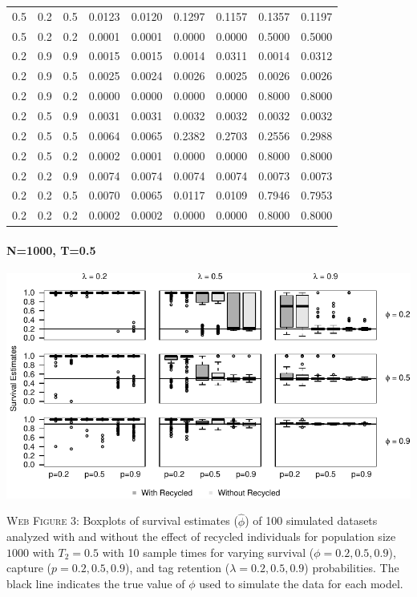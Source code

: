 \documentclass[]{article}
\let\oldparagraph\paragraph
\renewcommand{\paragraph}[1]{\oldparagraph{#1}\mbox{}}
\begin{document}
\begin{table}[ht]
{\begin{tabular}{rrrrrrrrr}
  0.5 & 0.2 & 0.5 & 0.0123 & 0.0120 & 0.1297 & 0.1157 & 0.1357 & 0.1197 \\ 
  0.5 & 0.2 & 0.2 & 0.0001 & 0.0001 & 0.0000 & 0.0000 & 0.5000 & 0.5000 \\ 
  0.2 & 0.9 & 0.9 & 0.0015 & 0.0015 & 0.0014 & 0.0311 & 0.0014 & 0.0312 \\ 
  0.2 & 0.9 & 0.5 & 0.0025 & 0.0024 & 0.0026 & 0.0025 & 0.0026 & 0.0026 \\ 
  0.2 & 0.9 & 0.2 & 0.0000 & 0.0000 & 0.0000 & 0.0000 & 0.8000 & 0.8000 \\ 
  0.2 & 0.5 & 0.9 & 0.0031 & 0.0031 & 0.0032 & 0.0032 & 0.0032 & 0.0032 \\ 
  0.2 & 0.5 & 0.5 & 0.0064 & 0.0065 & 0.2382 & 0.2703 & 0.2556 & 0.2988 \\ 
  0.2 & 0.5 & 0.2 & 0.0002 & 0.0001 & 0.0000 & 0.0000 & 0.8000 & 0.8000 \\ 
  0.2 & 0.2 & 0.9 & 0.0074 & 0.0074 & 0.0074 & 0.0074 & 0.0073 & 0.0073 \\ 
  0.2 & 0.2 & 0.5 & 0.0070 & 0.0065 & 0.0117 & 0.0109 & 0.7946 & 0.7953 \\ 
  0.2 & 0.2 & 0.2 & 0.0002 & 0.0002 & 0.0000 & 0.0000 & 0.8000 & 0.8000 \\ 
   \hline
\end{tabular}
}
\endgroup
\end{table}

\newpage

\paragraph{N=1000, T=0.5}\label{n1000-t0.5}

\includegraphics{Appendix_BW_files/figure-latex/figure3_survival_GJSTL4-1.pdf}

\textsc{Web Figure 3:} Boxplots of survival estimates (\(\hat{\phi}\))
of 100 simulated datasets analyzed with and without the effect of
recycled individuals for population size \(1000\) with \(T_2=0.5\) with
10 sample times for varying survival (\(\phi=0.2,0.5,0.9\)), capture
(\(p=0.2,0.5,0.9\)), and tag retention (\(\lambda=0.2,0.5,0.9\))
probabilities. The black line indicates the true value of \(\phi\) used
to simulate the data for each model.
\end{document}
